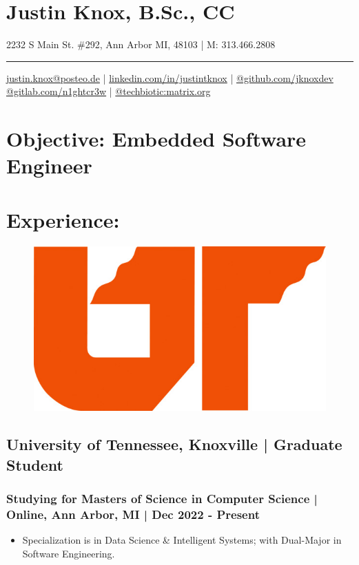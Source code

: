 \documentclass[letter,10pt]{article}
\author{arx}
\date{\today}
\title{}
\begin{document}
\section*{Justin Knox, B.Sc., CC}
\label{sec:orga642b71}
2232 S Main St. \#292, Ann Arbor MI, 48103 | M: 313.466.2808

\noindent\rule{\textwidth}{0.5pt}
\href{mailto:justin.knox@posteo.de}{justin.knox@posteo.de} | \href{https://www.linkedin.com/in/justintknox}{linkedin.com/in/justintknox} | \href{https://www.github.com/jknoxdev}{@github.com/jknoxdev} \\
\href{https://gitlab.com/n1ghtcr3w}{@gitlab.com/n1ghtcr3w} | \href{https://matrix.to/\#/@techbiotic:matrix.org}{@techbiotic:matrix.org}


\section*{Objective:              Embedded Software Engineer}
\label{sec:org256f298}
\section*{Experience:}
\label{sec:orga39ef84}
\begin{figure}
\includegraphics[width=0.45\linewidth]{./img/50p_cr_utk.jpg}
\end{figure}

\subsection*{University of Tennessee, Knoxville | Graduate Student}
\label{sec:org3d322c4}
\subsubsection*{Studying for Masters of Science in Computer Science | Online, Ann Arbor, MI | Dec 2022 - Present}
\label{sec:orga8cd593}
\begin{itemize}
\item Specialization is in Data Science \& Intelligent Systems; with Dual-Major in Software Engineering.
\end{itemize}
\end{document}

